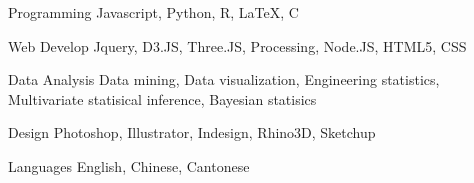 

\begin{cvskills}

  \cvskill
    {Programming} %
    {Javascript, Python, R, LaTeX, C} %

  \cvskill
    {Web Develop} %
    {Jquery, D3.JS, Three.JS, Processing, Node.JS, HTML5, CSS} %

  \cvskill
    {Data Analysis} %
    {Data mining, Data visualization, Engineering statistics, Multivariate statisical inference, Bayesian statisics} %

  \cvskill
    {Design} %
    {Photoshop, Illustrator, Indesign, Rhino3D, Sketchup} %

  \cvskill
    {Languages} %
    {English, Chinese, Cantonese} %

\end{cvskills}
